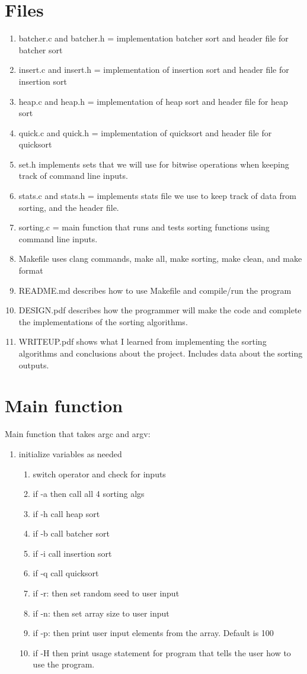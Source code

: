 \documentclass[11pt]{article}
\begin{document}
\section{Files}\label{ss:files}
\begin{enumerate}
\item batcher.c and batcher.h = implementation batcher sort and header file for batcher sort
\item insert.c and insert.h = implementation of insertion sort and header file for insertion sort
\item heap.c and heap.h = implementation of heap sort and header file for heap sort
\item quick.c and quick.h = implementation of quicksort and header file for quicksort
\item set.h implements sets that we will use for bitwise operations when keeping track of command line inputs.
\item stats.c and stats.h = implements stats file we use to keep track of data from sorting, and the header file.
\item sorting.c = main function that runs and tests sorting functions using command line inputs.
\item Makefile uses clang commands, make all, make sorting, make clean, and make format
\item README.md describes how to use Makefile and compile/run the program
\item DESIGN.pdf describes how the programmer will make the code and complete the implementations of the sorting algorithms.
\item WRITEUP.pdf shows what I learned from implementing the sorting algorithms and conclusions about the project. Includes data about the sorting outputs.
\end{enumerate}
\section{Main function}\label{ss:main}
Main function that takes argc and argv:
\begin{enumerate}
\item initialize variables as needed
	\begin{enumerate}
	\item switch operator and check for inputs
	\item if -a then call all 4 sorting algs
	\item if -h call heap sort
	\item if -b call batcher sort
	\item if -i call insertion sort
	\item if -q call quicksort
	\item if -r: then set random seed to user input
	\item if -n: then set array size to user input
	\item if -p: then print user input elements from the array. Default is 100
	\item if -H then print usage statement for program that tells the user how to use the program.
	\end{enumerate}
\end{enumerate}
\end{document}
